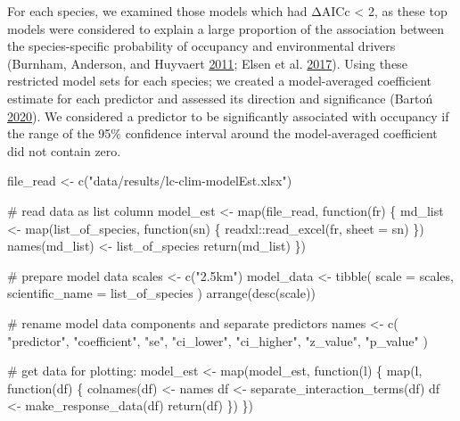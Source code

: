 \documentclass[]{article}
\newenvironment{Shaded}{}{}
\newcommand{\CommentTok}[1]{\textcolor[rgb]{0.00,0.50,0.00}{#1}}
\newcommand{\ControlFlowTok}[1]{\textcolor[rgb]{0.00,0.00,1.00}{#1}}
\newcommand{\DataTypeTok}[1]{#1}
\newcommand{\KeywordTok}[1]{\textcolor[rgb]{0.00,0.00,1.00}{#1}}
\newcommand{\NormalTok}[1]{#1}
\newcommand{\OperatorTok}[1]{#1}
\newcommand{\StringTok}[1]{\textcolor[rgb]{0.00,0.50,0.50}{#1}}
\begin{document}
For each species, we examined those models which had ΔAICc \textless{} 2, as these top models were considered to explain a large proportion of the association between the species-specific probability of occupancy and environmental drivers (Burnham, Anderson, and Huyvaert \protect\hyperlink{ref-burnham2011}{2011}; Elsen et al. \protect\hyperlink{ref-elsen2017}{2017}). Using these restricted model sets for each species; we created a model-averaged coefficient estimate for each predictor and assessed its direction and significance (Bartoń \protect\hyperlink{ref-MuMIn}{2020}). We considered a predictor to be significantly associated with occupancy if the range of the 95\% confidence interval around the model-averaged coefficient did not contain zero.

\begin{Shaded}
\begin{Highlighting}[numbers=left,,]
\NormalTok{file_read <-}\StringTok{ }\KeywordTok{c}\NormalTok{(}\StringTok{"data/results/lc-clim-modelEst.xlsx"}\NormalTok{)}

\CommentTok{# read data as list column}
\NormalTok{model_est <-}\StringTok{ }\KeywordTok{map}\NormalTok{(file_read, }\ControlFlowTok{function}\NormalTok{(fr) \{}
\NormalTok{  md_list <-}\StringTok{ }\KeywordTok{map}\NormalTok{(list_of_species, }\ControlFlowTok{function}\NormalTok{(sn) \{}
\NormalTok{    readxl}\OperatorTok{::}\KeywordTok{read_excel}\NormalTok{(fr, }\DataTypeTok{sheet =}\NormalTok{ sn)}
\NormalTok{  \})}
  \KeywordTok{names}\NormalTok{(md_list) <-}\StringTok{ }\NormalTok{list_of_species}
  \KeywordTok{return}\NormalTok{(md_list)}
\NormalTok{\})}

\CommentTok{# prepare model data}
\NormalTok{scales <-}\StringTok{ }\KeywordTok{c}\NormalTok{(}\StringTok{"2.5km"}\NormalTok{)}
\NormalTok{model_data <-}\StringTok{ }\KeywordTok{tibble}\NormalTok{(}
  \DataTypeTok{scale =}\NormalTok{ scales,}
  \DataTypeTok{scientific_name =}\NormalTok{ list_of_species}
\NormalTok{) }\OperatorTok{%
\StringTok{  }\KeywordTok{arrange}\NormalTok{(}\KeywordTok{desc}\NormalTok{(scale))}

\CommentTok{# rename model data components and separate predictors}
\NormalTok{names <-}\StringTok{ }\KeywordTok{c}\NormalTok{(}
  \StringTok{"predictor"}\NormalTok{, }\StringTok{"coefficient"}\NormalTok{, }\StringTok{"se"}\NormalTok{, }\StringTok{"ci_lower"}\NormalTok{,}
  \StringTok{"ci_higher"}\NormalTok{, }\StringTok{"z_value"}\NormalTok{, }\StringTok{"p_value"}
\NormalTok{)}

\CommentTok{# get data for plotting:}
\NormalTok{model_est <-}\StringTok{ }\KeywordTok{map}\NormalTok{(model_est, }\ControlFlowTok{function}\NormalTok{(l) \{}
  \KeywordTok{map}\NormalTok{(l, }\ControlFlowTok{function}\NormalTok{(df) \{}
    \KeywordTok{colnames}\NormalTok{(df) <-}\StringTok{ }\NormalTok{names}
\NormalTok{    df <-}\StringTok{ }\KeywordTok{separate_interaction_terms}\NormalTok{(df)}
\NormalTok{    df <-}\StringTok{ }\KeywordTok{make_response_data}\NormalTok{(df)}
    \KeywordTok{return}\NormalTok{(df)}
\NormalTok{  \})}
\NormalTok{\})}

}
\end{Highlighting}
\end{Shaded}
\end{document}
